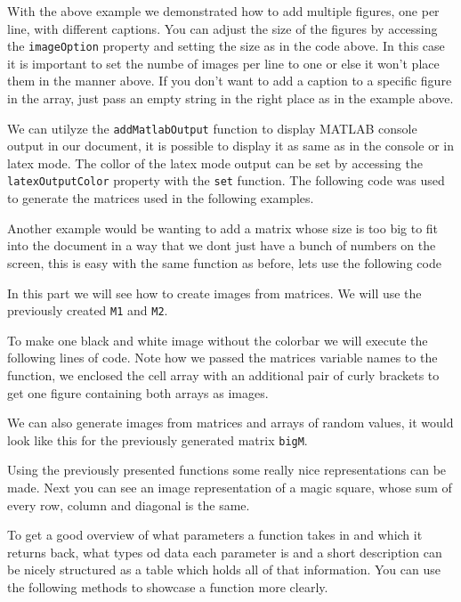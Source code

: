 
With the above example we demonstrated how to add multiple figures, one per line, with different captions. You can adjust
the size of the figures by accessing the {\tt imageOption} property and setting the size as in the code above. In this case it
is important to set the numbe of images per line to one or else it won't place them in the manner above. If you don't want 
to add a caption to a specific figure in the array, just pass an empty string in the right place as in the example above.


We can utilyze the {\tt addMatlabOutput} function to display MATLAB console output in our document, it is possible to display
it as same as in the console or in latex mode. The collor of the latex mode output can be set by accessing the {\tt latexOutputColor}
property with the {\tt set} function. The following code was used to generate the matrices used in the following examples.


Another example would be wanting to add a matrix whose size is too big to fit into the document in a way that we 
dont just have a bunch of numbers on the screen, this is easy with the same function as before, lets use the following code
 

In this part we will see how to create images from matrices. We will use the previously created {\tt M1} and {\tt M2}.


To make one black and white image without the colorbar we will execute the following lines of code. Note how we passed the 
matrices variable names to the function, we enclosed the cell array with an additional pair of curly brackets to get one 
figure containing both arrays as images.


We can also generate images from matrices and arrays of random values, it would look like this for the previously generated
matrix {\tt bigM}.


Using the previously presented functions some really nice representations can be made. Next you can see an image representation
of a magic square, whose sum of every row, column and diagonal is the same.


To get a good overview of what parameters a function takes in and which it returns back, what types od data each parameter is
and a short description can be nicely structured as a table which holds all of that information. You can use the following 
methods to showcase a function more clearly. 

